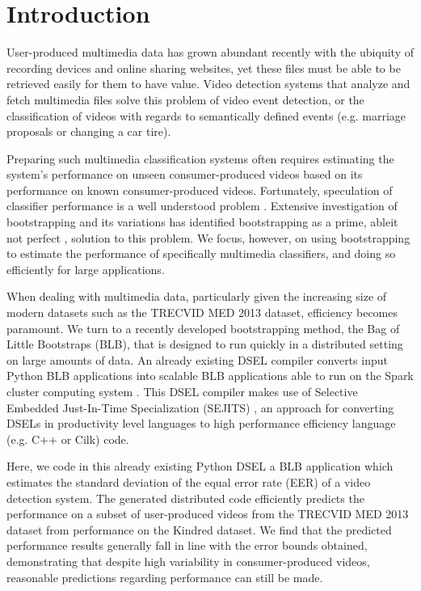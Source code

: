 \section{Introduction}
User-produced multimedia data has grown abundant recently with the ubiquity of recording devices and online sharing websites, yet these files must be able to be retrieved easily for them to have value. 
Video detection systems that analyze and fetch multimedia files solve this problem of video event detection, or the classification of videos with regards to semantically defined events (e.g. marriage proposals or changing a car tire). 

Preparing such multimedia classification systems often requires estimating the system's performance on unseen consumer-produced videos based on its performance on known consumer-produced videos. Fortunately, speculation of classifier performance is a well understood problem \cite{fukunaga1989estimation}. 
Extensive investigation of bootstrapping and its variations \cite{efron1979bootstrap,jain1987bootstrap, chernick1985application, sahiner2008classifier} has identified bootstrapping as a prime, ableit not perfect \cite{isaksson2008cross},
solution to this problem. We focus, however, on using bootstrapping to estimate the performance of specifically multimedia classifiers, and doing so efficiently for large applications.

When dealing with multimedia data, particularly given the increasing size of modern datasets such as the TRECVID MED 2013 dataset, efficiency becomes paramount. 
We turn to a recently developed bootstrapping method, the Bag of Little Bootstraps (BLB)\cite{kleiner2012big,kleiner2011scalable}, that is designed to run quickly in a distributed setting on large amounts of data.
An already existing DSEL compiler \cite{pbirsinger2013} converts input Python BLB applications into scalable BLB applications able to run on the Spark cluster computing system \cite{zaharia2010spark}. 
This DSEL compiler makes use of Selective Embedded Just-In-Time Specialization (SEJITS) \cite{Kamil:EECS-2013-1}, an approach for converting DSELs in productivity level languages to high performance efficiency language (e.g. C++ or Cilk) code. 

Here, we code in this already existing Python DSEL a BLB application which estimates the standard deviation of the equal error rate (EER) of a video detection system. The generated distributed code efficiently predicts the performance on a subset of user-produced videos from the TRECVID MED 2013 dataset from performance on the Kindred dataset. 
We find that the predicted performance results generally fall in line with the error bounds obtained, demonstrating that despite high variability in consumer-produced videos, reasonable predictions regarding performance can still be made. 


